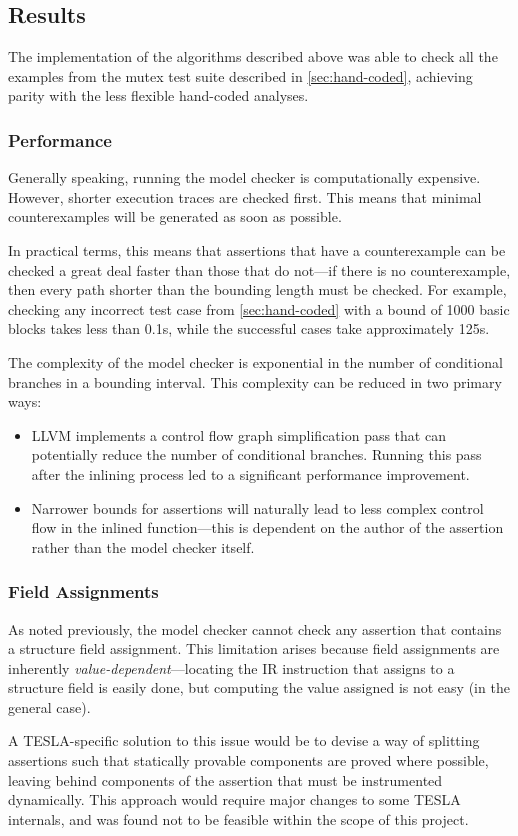 \subsection{Results} \label{sec:model-limits}

The implementation of the algorithms described above was able to check all the
examples from the mutex test suite described in \autoref{sec:hand-coded},
achieving parity with the less flexible hand-coded analyses.

\subsubsection{Performance}

Generally speaking, running the model checker is computationally expensive.
However, shorter execution traces are checked first. This means that minimal
counterexamples will be generated as soon as possible.

In practical terms, this means that assertions that have a counterexample can be
checked a great deal faster than those that do not---if there is no
counterexample, then every path shorter than the bounding length must be
checked. For example, checking any incorrect test case from
\autoref{sec:hand-coded} with a bound of \num{1000} basic blocks takes less than
\num{0.1}\si{\second}, while the successful cases take approximately
\num{125}\si{\second}. 

The complexity of the model checker is exponential in the number of conditional
branches in a bounding interval. This complexity can be reduced in two primary
ways:
\begin{itemize}
  \item LLVM implements a control flow graph simplification pass that can
    potentially reduce the number of conditional branches. Running this pass
    after the inlining process led to a significant performance improvement.
  \item Narrower bounds for assertions will naturally lead to less complex
    control flow in the inlined function---this is dependent on the author of
    the assertion rather than the model checker itself.
\end{itemize}

\subsubsection{Field Assignments}

As noted previously, the model checker cannot check any assertion that
contains a structure field assignment. This limitation arises because
field assignments are inherently \emph{value-dependent}---locating the
IR instruction that assigns to a structure field is easily done, but
computing the value assigned is not easy (in the general case).

A TESLA-specific solution to this issue would be to devise a way of
splitting assertions such that statically provable components are proved
where possible, leaving behind components of the assertion that must be
instrumented dynamically. This approach would require major changes to
some TESLA internals, and was found not to be feasible within the scope
of this project.
